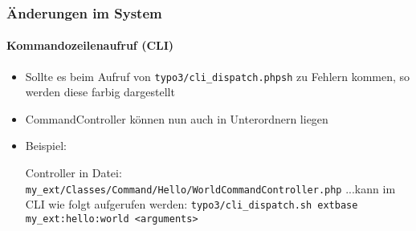 \begin{frame}[fragile]
	\frametitle{Änderungen im System}
	\framesubtitle{Kommandozeilenaufruf (CLI)}

	\lstset{basicstyle=\tiny\ttfamily}

	\begin{itemize}

		\item Sollte es beim Aufruf von \texttt{typo3/cli\_dispatch.phpsh} zu Fehlern kommen,
			so werden diese farbig dargestellt

		\item CommandController können nun auch in Unterordnern liegen

		\item Beispiel:\newline

			Controller in Datei:\newline
			\smaller\texttt{my\_ext/Classes/Command/Hello/WorldCommandController.php}\normalsize\newline
			...kann im CLI wie folgt aufgerufen werden:\newline
			\smaller\texttt{typo3/cli\_dispatch.sh extbase my\_ext:hello:world <arguments>}\normalsize

	\end{itemize}

\end{frame}

